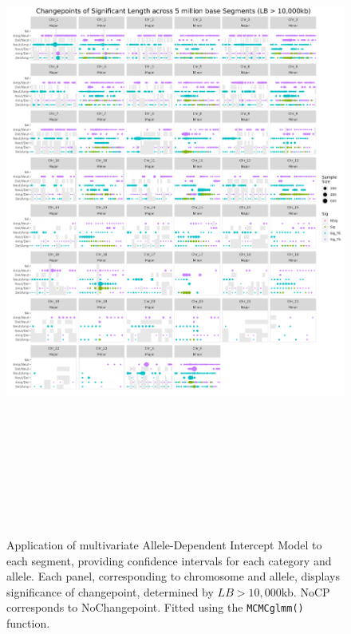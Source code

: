 \begin{figure}[H]
\centering
\includegraphics[width = 1\textwidth, height = 22cm]{../figures/Chapter_6/PerSegments_MCMC_10000kb_fivemillion_Thesis.png}
\caption[Application of multivariate Allele-Dependent Intercept Model to each segment, providing confidence intervals for each category and allele. Significance determined by $LB > 10,000$kb.]{Application of multivariate Allele-Dependent Intercept Model to each segment, providing confidence intervals for each category and allele. Each panel, corresponding to chromosome and allele, displays significance of changepoint, determined by $LB > 10,000$kb. NoCP corresponds to NoChangepoint. Fitted using the \texttt{MCMCglmm()} function.}
\label{fig:PerSegment_MCMC_10000}
\end{figure}

